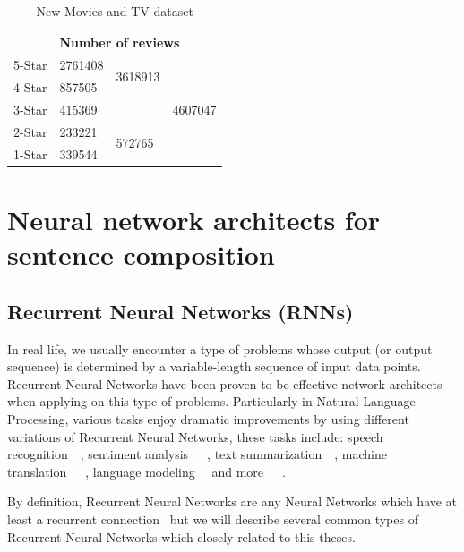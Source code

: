 \begin{table}[H]
    \centering
    \caption{New Movies and TV dataset}
    \label{table:moviereview}
    \begin{tabular}{@{}lllc@{}}
        \toprule
        & \multicolumn{3}{l}{Number of reviews}                         \\ \midrule
        5-Star & 2761408 & \multirow{2}{*}{3618913} & \multirow{5}{*}{4607047} \\ \cmidrule(r){1-2}
        4-Star & 857505  &                          &                          \\ \cmidrule(r){1-3}
        3-Star & \multicolumn{2}{l}{415369}         &                          \\ \cmidrule(r){1-3}
        2-Star & 233221  & \multirow{2}{*}{572765}  &                          \\ \cmidrule(r){1-2}
        1-Star & 339544  &                          &                          \\ \bottomrule
    \end{tabular}
\end{table}


\section{Neural network architects for sentence composition}\label{sec:composer}
\subsection{Recurrent Neural Networks (RNNs)}\label{sec:RNN}
In real life, we usually encounter a type of problems whose output (or output sequence) is determined by a variable-length sequence of input data points.
Recurrent Neural Networks have been proven to be effective network architects when applying on this type of problems.
Particularly in Natural Language Processing, various tasks enjoy dramatic improvements by using different variations of Recurrent Neural Networks, these tasks include:  speech recognition~\cite{speech-lstm}~\cite{MiaoGM15}, sentiment analysis~\cite{treeLSTM}~\cite{cnn-rnn}~\cite{attention-gru}, text summarization~\cite{RushCW15}~\cite{NallapatiXZ16}, machine translation~\cite{FiratCB16}~\cite{SutskeverVL14}~\cite{BritzGLL17}, language modeling~\cite{mikolov-nlm}~\cite{JozefowiczVSSW16} and more~\cite{deep-nlp}~\cite{Schmidhuber14}~\cite{deeplearning-book}.

By definition, Recurrent Neural Networks are any Neural Networks which have at least a recurrent connection~\cite{rnn-def} but we will describe several common types of Recurrent Neural Networks which closely related to this theses.

